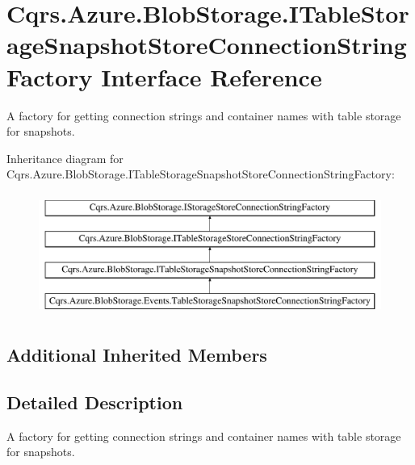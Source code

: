 \hypertarget{interfaceCqrs_1_1Azure_1_1BlobStorage_1_1ITableStorageSnapshotStoreConnectionStringFactory}{}\section{Cqrs.\+Azure.\+Blob\+Storage.\+I\+Table\+Storage\+Snapshot\+Store\+Connection\+String\+Factory Interface Reference}
\label{interfaceCqrs_1_1Azure_1_1BlobStorage_1_1ITableStorageSnapshotStoreConnectionStringFactory}


A factory for getting connection strings and container names with table storage for snapshots.  


Inheritance diagram for Cqrs.\+Azure.\+Blob\+Storage.\+I\+Table\+Storage\+Snapshot\+Store\+Connection\+String\+Factory\+:\begin{figure}[H]
\begin{center}
\leavevmode
\includegraphics[height=4.000000cm]{interfaceCqrs_1_1Azure_1_1BlobStorage_1_1ITableStorageSnapshotStoreConnectionStringFactory}
\end{center}
\end{figure}
\subsection*{Additional Inherited Members}


\subsection{Detailed Description}
A factory for getting connection strings and container names with table storage for snapshots. 

